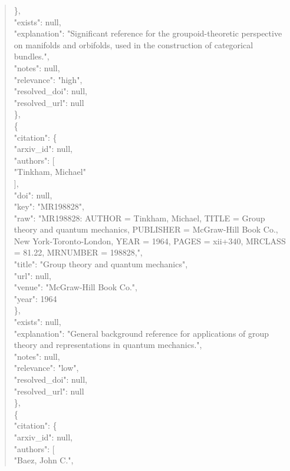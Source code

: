 \documentclass[11pt]{article}
\begin{document}
\begin{quote}
      \},\\
      "exists": null,\\
      "explanation": "Significant reference for the groupoid-theoretic perspective on manifolds and orbifolds, used in the construction of categorical bundles.",\\
      "notes": null,\\
      "relevance": "high",\\
      "resolved\_doi": null,\\
      "resolved\_url": null\\
    \},\\
    \{\\
      "citation": \{\\
        "arxiv\_id": null,\\
        "authors": [\\
          "Tinkham, Michael"\\
        ],\\
        "doi": null,\\
        "key": "MR198828",\\
        "raw": "MR198828: AUTHOR = Tinkham, Michael, TITLE = Group theory and quantum mechanics, PUBLISHER = McGraw-Hill Book Co., New York-Toronto-London, YEAR = 1964, PAGES = xii+340, MRCLASS = 81.22, MRNUMBER = 198828,",\\
        "title": "Group theory and quantum mechanics",\\
        "url": null,\\
        "venue": "McGraw-Hill Book Co.",\\
        "year": 1964\\
      \},\\
      "exists": null,\\
      "explanation": "General background reference for applications of group theory and representations in quantum mechanics.",\\
      "notes": null,\\
      "relevance": "low",\\
      "resolved\_doi": null,\\
      "resolved\_url": null\\
    \},\\
    \{\\
      "citation": \{\\
        "arxiv\_id": null,\\
        "authors": [\\
          "Baez, John C.",\\

\end{quote}
\end{document}
